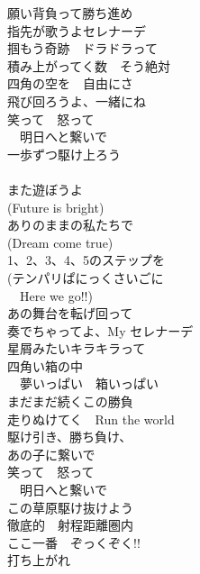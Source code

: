 {願い背負って勝ち進め\\
指先が歌うよセレナーデ\\
掴もう奇跡　ドラドラって\\
積み上がってく数　そう絶対\\

四角の空を　自由にさ\\
飛び回ろうよ、一緒にね\\
笑って　怒って\\　明日へと繋いで\\
一歩ずつ駆け上ろう\\
\newcolumn\quad\\
また遊ぼうよ　\\(Future is bright)\\
ありのままの私たちで　\\(Dream come true)\\
1、2、3、4、5のステップを\\
(テンパリぱにっくさいごに\\　Here we go!!)\\

あの舞台を転げ回って\\
奏でちゃってよ、My セレナーデ\\
星屑みたいキラキラって\\
四角い箱の中\\　夢いっぱい　箱いっぱい\\

まだまだ続くこの勝負\\
走りぬけてく　Run the world\\
駆け引き、勝ち負け、\\あの子に繋いで\\
笑って　怒って\\　明日へと繋いで\\
この草原駆け抜けよう\\

徹底的　射程距離圏内\\
ここ一番　ぞっくぞく!!\\
打ち上がれ
}


